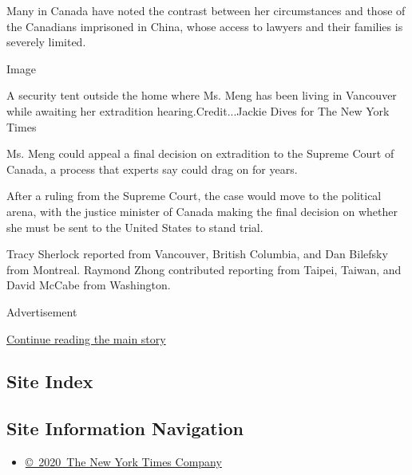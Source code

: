 Many in Canada have noted the contrast between her circumstances and
those of the Canadians imprisoned in China, whose access to lawyers and
their families is severely limited.

Image

A security tent outside the home where Ms. Meng has been living in
Vancouver while awaiting her extradition hearing.Credit...Jackie Dives
for The New York Times

Ms. Meng could appeal a final decision on extradition to the Supreme
Court of Canada, a process that experts say could drag on for years.

After a ruling from the Supreme Court, the case would move to the
political arena, with the justice minister of Canada making the final
decision on whether she must be sent to the United States to stand
trial.

Tracy Sherlock reported from Vancouver, British Columbia, and Dan
Bilefsky from Montreal. Raymond Zhong contributed reporting from Taipei,
Taiwan, and David McCabe from Washington.

Advertisement

\protect\hyperlink{after-bottom}{Continue reading the main story}

\hypertarget{site-index}{%
\subsection{Site Index}\label{site-index}}

\hypertarget{site-information-navigation}{%
\subsection{Site Information
Navigation}\label{site-information-navigation}}

\begin{itemize}
\tightlist
\item
  \href{https://help.nytimes3xbfgragh.onion/hc/en-us/articles/115014792127-Copyright-notice}{©~2020~The
  New York Times Company}
\end{itemize}


